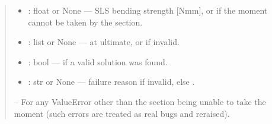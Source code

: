\documentclass[a4paper,11pt,german]{sphinxmanual}
\begin{document}
\begin{fulllineitems}
\begin{quote}
\begin{description}
\begin{itemize}
\item {} 
\sphinxAtStartPar
{} : float or None — SLS bending strength {[}Nmm{]}, or 
if the moment cannot be taken by the section.

\item {} 
\sphinxAtStartPar
{} : list or None —  at
ultimate, or  if invalid.

\item {} 
\sphinxAtStartPar
{} : bool —  if a valid solution was found.

\item {} 
\sphinxAtStartPar
{} : str or None — failure reason if invalid, else .

\end{itemize}


\sphinxAtStartPar
{}

\sphinxAtStartPar
{} – For any ValueError other than the section being unable to take the
    moment (such errors are treated as real bugs and re\sphinxhyphen{}raised).

\end{description}\end{quote}

\end{fulllineitems}

\end{document}
